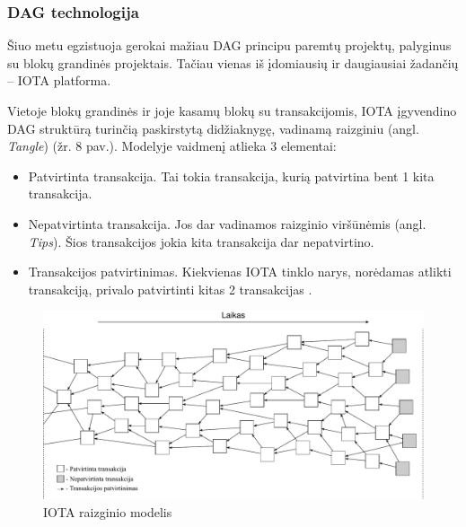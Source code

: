 \subsubsection{DAG technologija}

Šiuo metu egzistuoja gerokai mažiau DAG principu paremtų projektų, palyginus su blokų grandinės projektais. Tačiau vienas iš įdomiausių ir daugiausiai žadančių – IOTA platforma. 





Vietoje blokų grandinės ir joje kasamų blokų su transakcijomis, IOTA įgyvendino DAG struktūrą turinčią paskirstytą didžiaknygę, vadinamą raizginiu (angl. \textit{Tangle}) (žr. 8 pav.). Modelyje vaidmenį atlieka 3 elementai:
\begin{itemize}
    \item Patvirtinta transakcija. Tai tokia transakcija, kurią patvirtina bent 1 kita transakcija.
    \item Nepatvirtinta transakcija. Jos dar vadinamos raizginio viršūnėmis (angl. \textit{Tips}). Šios transakcijos jokia kita transakcija dar nepatvirtino.
    \item Transakcijos patvirtinimas. Kiekvienas IOTA tinklo narys, norėdamas atlikti transakciją, privalo patvirtinti kitas 2 transakcijas \cite{popov2016tangle}.
\end{itemize} 

\begin{figure}[H]
    \centering
    \includegraphics[scale=0.56]{images/iota-tangle}
    \caption{IOTA raizginio modelis}
\end{figure}

